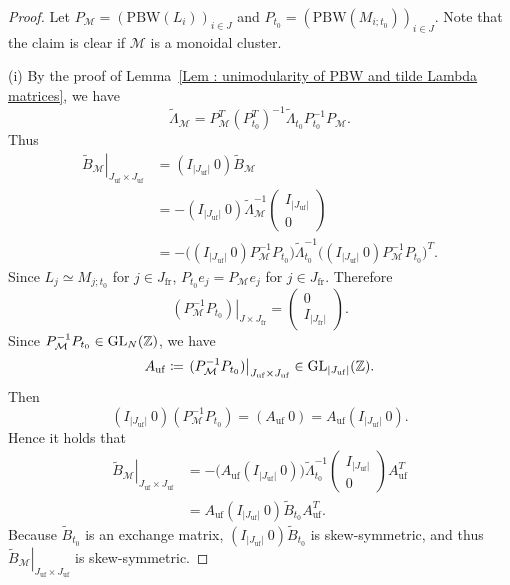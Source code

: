 \begin{proof}
Let $P_{\mathcal M} = (\mathrm{PBW}(L_i))_{i \in J}$ and
$P_{t_0} = (\mathrm{PBW}(M_{i;t_0}))_{i \in J}$.
Note that the claim is clear if $\mathcal M$ is a monoidal cluster.

(i) By the proof of
Lemma~\ref{Lem : unimodularity of PBW and tilde Lambda matrices},
we have
\[
\widetilde\Lambda_{\mathcal M}
= P_{\mathcal M}^{T}(P_{t_0}^{T})^{-1}
\widetilde\Lambda_{t_0}P_{t_0}^{-1}P_{\mathcal M}.
\]
Thus
\[
\begin{aligned}
\left.\widetilde B_{\mathcal M}\right|_
{J_{\mathrm{uf}} \times J_{\mathrm{uf}}}
&= (I_{|J_{\mathrm{uf}}|}\ 0)\widetilde B_{\mathcal M} \\
&= -(I_{|J_{\mathrm{uf}}|}\ 0)\widetilde\Lambda_{\mathcal M}^{-1}
\begin{pmatrix} I_{|J_{\mathrm{uf}}|} \\ 0 \end{pmatrix} \\
&= -\bigl((I_{|J_{\mathrm{uf}}|}\ 0)P_{\mathcal M}^{-1}P_{t_0}\bigr)
\widetilde\Lambda_{t_0}^{-1}
\bigl((I_{|J_{\mathrm{uf}}|}\ 0)P_{\mathcal M}^{-1}P_{t_0}\bigr)^{T}.
\end{aligned}
\]
Since $L_j \simeq M_{j;t_0}$ for $j \in J_{\mathrm{fr}}$,
$P_{t_0}e_j = P_{\mathcal M}e_j$ for $j \in J_{\mathrm{fr}}$.
Therefore
\[
\left.(P_{\mathcal M}^{-1}P_{t_0})\right|_
{J \times J_{\mathrm{fr}}}
= \begin{pmatrix} 0 \\ I_{|J_{\mathrm{fr}}|} \end{pmatrix}.
\]
Since $P_{\mathcal M}^{-1}P_{t_0} \in \mathrm{GL}_N(\mathbb{Z})$, we have
\[
A_{\mathrm{uf}} \coloneq
\left.(P_{\mathcal M}^{-1}P_{t_0})\right|_
{J_{\mathrm{uf}} \times J_{\mathrm{uf}}}
\in \mathrm{GL}_{|J_{\mathrm{uf}}|}(\mathbb{Z}).
\]
Then
\[
(I_{|J_{\mathrm{uf}}|}\ 0)(P_{\mathcal M}^{-1}P_{t_0})
= (A_{\mathrm{uf}}\ 0)
= A_{\mathrm{uf}}(I_{|J_{\mathrm{uf}}|}\ 0).
\]
Hence it holds that
\[
\begin{aligned}
\left.\widetilde B_{\mathcal M}\right|_
{J_{\mathrm{uf}} \times J_{\mathrm{uf}}}
&= -\bigl(A_{\mathrm{uf}}(I_{|J_{\mathrm{uf}}|}\ 0)\bigr)
\widetilde\Lambda_{t_0}^{-1}
\begin{pmatrix} I_{|J_{\mathrm{uf}}|} \\ 0 \end{pmatrix}
A_{\mathrm{uf}}^{T} \\
&= A_{\mathrm{uf}}(I_{|J_{\mathrm{uf}}|}\ 0)
\widetilde B_{t_0}A_{\mathrm{uf}}^{T}.
\end{aligned}
\]
Because $\widetilde B_{t_0}$ is an exchange matrix,
$(I_{|J_{\mathrm{uf}}|}\ 0)\widetilde B_{t_0}$ is skew-symmetric,
and thus
$\left.\widetilde B_{\mathcal M}\right|_
{J_{\mathrm{uf}} \times J_{\mathrm{uf}}}$ is skew-symmetric.


\end{proof}
